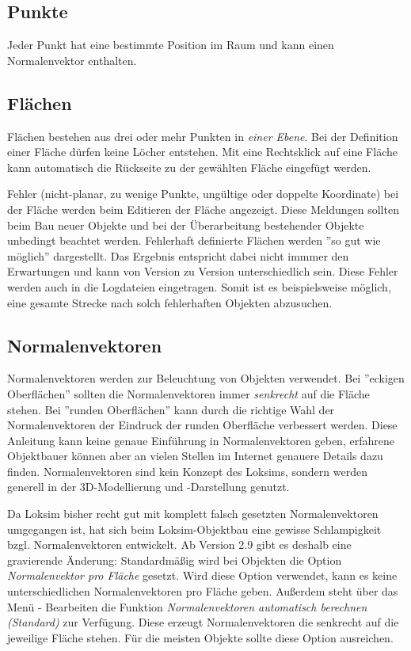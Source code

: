 \subsection{Punkte}
Jeder Punkt hat eine bestimmte Position im Raum und kann einen Normalenvektor enthalten.

\subsection{Flächen}
\label{sec:editor-obj-l3dobj-flaeche}
Flächen bestehen aus drei oder mehr Punkten in \emph{einer Ebene}. Bei der Definition einer Fläche dürfen keine Löcher entstehen. Mit eine Rechtsklick auf eine Fläche kann automatisch die Rückseite zu der gewählten Fläche eingefügt werden.

Fehler (nicht-planar, zu wenige Punkte, ungültige oder doppelte Koordinate) bei der Fläche werden beim Editieren der Fläche angezeigt. Diese Meldungen sollten beim Bau neuer Objekte und bei der Überarbeitung bestehender Objekte unbedingt beachtet werden. Fehlerhaft definierte Flächen werden ''so gut wie möglich'' dargestellt. Das Ergebnis entspricht dabei nicht immmer den Erwartungen und kann von Version zu Version unterschiedlich sein. Diese Fehler werden auch in die Logdateien eingetragen. Somit ist es beispielsweise möglich, eine gesamte Strecke nach solch fehlerhaften Objekten abzusuchen.

\subsection{Normalenvektoren}
\label{sec:editor-obj-l3dobj-normalen}
Normalenvektoren werden zur Beleuchtung von Objekten verwendet. Bei ''eckigen Oberflächen'' sollten die Normalenvektoren immer \emph{senkrecht} auf die Fläche stehen. Bei ''runden Oberflächen'' kann durch die richtige Wahl der Normalenvektoren der Eindruck der runden Oberfläche verbessert werden. Diese Anleitung kann keine genaue Einführung in Normalenvektoren geben, erfahrene Objektbauer können aber an vielen Stellen im Internet genauere Details dazu finden. Normalenvektoren sind kein Konzept des Loksims, sondern werden  generell in der 3D-Modellierung und -Darstellung genutzt.

Da Loksim bisher recht gut mit komplett falsch gesetzten Normalenvektoren umgegangen ist, hat sich beim Loksim-Objektbau eine gewisse Schlampigkeit bzgl. Normalenvektoren entwickelt. Ab Version 2.9 gibt es deshalb eine gravierende Änderung: Standardmäßig wird bei Objekten die Option \emph{Normalenvektor pro Fläche} gesetzt. Wird diese Option verwendet, kann es keine unterschiedlichen Normalenvektoren pro Fläche geben. Außerdem steht über das Menü - Bearbeiten die Funktion \emph{Normalenvektoren automatisch berechnen (Standard)} zur Verfügung. Diese erzeugt Normalenvektoren die senkrecht auf die jeweilige Fläche stehen. Für die meisten Objekte sollte diese Option ausreichen. 

